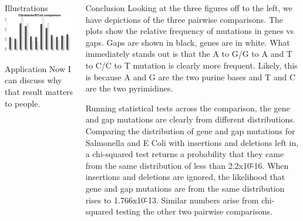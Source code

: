 \documentclass[final]{beamer}
\begin{document}
\begin{frame}{}
\begin{columns}[t]
\begin{column}{.32 \linewidth}
\begin{block}{\large Illustrations}
 \includegraphics[scale = .455]{CBECPercentage.jpeg}


\end{block}


\begin{block}{\large Application}
  Now I can discuss why that result matters to people.
\end{block}

\end{column}




\begin{column}{.32 \linewidth}

\begin{block}{\large Conclusion}
Looking at the three figures off to the left, we have depictions of the three pairwise comparisons. The plots show the relative frequency of mutations in genes vs gaps. Gaps are shown in black, genes are in white. What immediately stands out is that the A to G/G to A and T to C/C to T mutation is clearly more frequent. Likely, this is because A and G are the two purine bases and T and C are the two pyrimidines.

Running statistical tests across the comparison, the gene and gap mutations are clearly from different distributions. Comparing the distribution of gene and gap mutations for Salmonella and E Coli with insertions and deletions left in, a chi-squared test returns a probability that they came from the same distribution of less than 2.2x10\^-16. When insertions and deletions are ignored, the likelihood that gene and gap mutations are from the same distribution rises to 1.766x10\^-13. Similar numbers arise from chi-squared testing the other two pairwise comparisons. 


\end{block}
\end{column}
\end{columns}
\end{frame}
\end{document}
